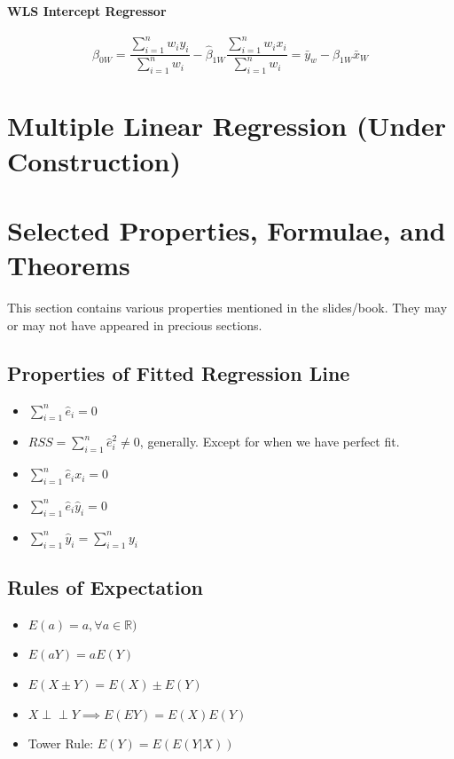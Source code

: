 \documentclass[11pt]{article}
\newcommand{\real}{\mathbb{R}}
\newcommand{\independent}{\perp \!\!\! \perp}
\begin{document}
\paragraph{WLS Intercept Regressor}
\begin{equation}
    \hat{\beta}_{0 W}=\frac{\sum_{i=1}^{n} w_{i} y_{i}}{\sum_{i=1}^{n} w_{i}}-\hat{\beta}_{1 W} \frac{\sum_{i=1}^{n} w_{i} x_{i}}{\sum_{i=1}^{n} w_{i}} = \bar{y}_{w}-\hat{\beta}_{1 W} \bar{x}_{W}
\end{equation}

\section{Multiple Linear Regression (Under Construction)}

\section{Selected Properties, Formulae, and Theorems}
This section contains various properties mentioned in the slides/book. They may or may not have appeared in precious sections. 
\subsection{Properties of Fitted Regression Line}
\begin{itemize}
    \item $\sum_{i = 1}^n \hat{e}_i = 0$
    \item $RSS = \sum_{i = 1}^n \hat{e}_i^2 \neq 0$, generally. Except for when we have perfect fit.
    \item $\sum_{i= 1}^n \hat{e}_i x_i = 0$
    \item $\sum_{i= 1}^n \hat{e}_i \hat{y}_i = 0$
    \item $\sum_{i = 1}^n \hat{y}_i = \sum_{i= 1}^n y_i$
\end{itemize}

\subsection{Rules of Expectation}
\begin{itemize}
    \item $E(a) = a, \forall a \in \real)$
    \item $E(aY) = aE(Y)$
    \item $E(X \pm Y) = E(X) \pm E(Y)$
    \item $X\independent Y \implies E(EY) = E(X) E(Y)$
    \item Tower Rule: $E(Y) = E(E(Y|X))$
\end{itemize}
\end{document}
